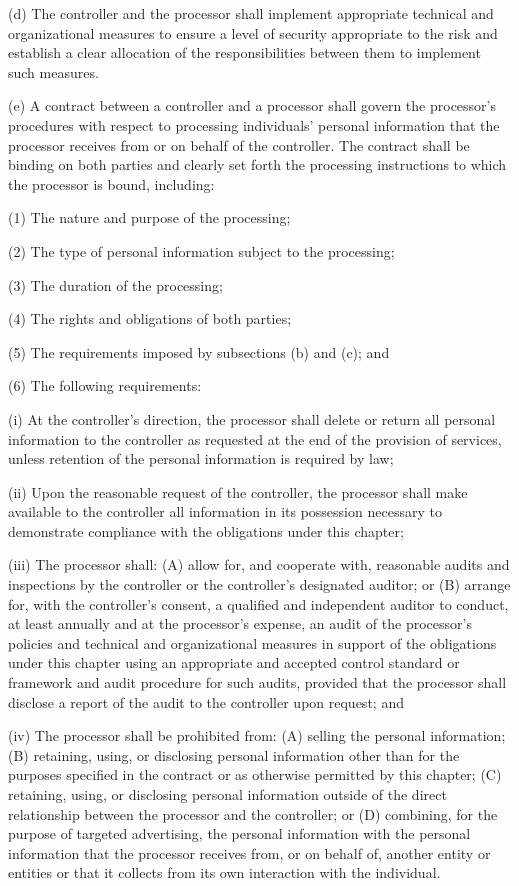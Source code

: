 (d) The controller and the processor shall implement appropriate technical and organizational measures to ensure a level of security appropriate to the risk and establish a clear allocation of the responsibilities between them to implement such measures.

(e) A contract between a controller and a processor shall govern the processor’s procedures with respect to processing individuals’ personal information that the processor receives from or on behalf of the controller. The contract shall be binding on both parties and clearly set forth the processing instructions to which the processor is bound, including:

(1) The nature and purpose of the processing;

(2) The type of personal information subject to the processing;

(3) The duration of the processing;

(4) The rights and obligations of both parties;

(5) The requirements imposed by subsections (b) and (c); and

(6) The following requirements:

(i) At the controller’s direction, the processor shall delete or return all personal information to the controller as requested at the end of the provision of services, unless retention of the personal information is required by law;

(ii) Upon the reasonable request of the controller, the processor shall make available to the controller all information in its possession necessary to demonstrate compliance with the obligations under this chapter;

(iii) The processor shall: (A) allow for, and cooperate with, reasonable audits and inspections by the controller or the controller’s designated auditor; or (B) arrange for, with the controller’s consent, a qualified and independent auditor to conduct, at least annually and at the processor’s expense, an audit of the processor’s policies and technical and organizational measures in support of the obligations under this chapter using an appropriate and accepted control standard or framework and audit procedure for such audits, provided that the processor shall disclose a report of the audit to the controller upon request; and

(iv) The processor shall be prohibited from: (A) selling the personal information; (B) retaining, using, or disclosing personal information other than for the purposes specified in the contract or as otherwise permitted by this chapter; (C) retaining, using, or disclosing personal information outside of the direct relationship between the processor and the controller; or (D) combining, for the purpose of targeted advertising, the personal information with the personal information that the processor receives from, or on behalf of, another entity or entities or that it collects from its own interaction with the individual.

